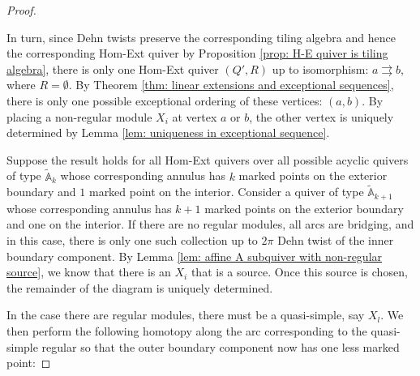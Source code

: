 \documentclass[12pt]{amsart}
\theoremstyle{plain}
\theoremstyle{definition}
\theoremstyle{remark}
\begin{document}
\begin{proof}
\begin{center}
\end{center}

In turn, since Dehn twists preserve the corresponding tiling algebra and hence the corresponding Hom-Ext quiver by Proposition \ref{prop: H-E quiver is tiling algebra}, there is only one Hom-Ext quiver {\color{black}$(Q',R)$} up to {\color{black} isomorphism}: $a \rightrightarrows b$, where $R = \emptyset$. By Theorem \ref{thm: linear extensions and exceptional sequences}, there is only one possible exceptional ordering of these vertices: $(a,b)$. By placing a non-regular module $X_i$ at vertex $a$ or $b$, the other vertex is uniquely determined by Lemma \ref{lem: uniqueness in exceptional sequence}.

{\color{black} Suppose the result holds for all Hom-Ext quivers over all possible acyclic quivers of type $\tilde{\mathbb{A}}_{k}$ whose corresponding annulus has $k$ marked points on the exterior boundary and $1$ marked point on the interior. Consider a quiver of type $\tilde{\mathbb{A}}_{k+1}$ whose corresponding annulus has $k+1$ marked points on the exterior boundary and one on the interior. If there are no regular modules, all arcs are bridging, and in this case, there is only one such collection up to $2\pi$ Dehn twist of the inner boundary component. By Lemma \ref{lem: affine A subquiver with non-regular source}, we know that there is an $X_i$ that is a source. Once this source is chosen, the remainder of the diagram is uniquely determined. 

In the case there are regular modules, there must be a quasi-simple, say $X_l$. We then perform the following homotopy along the arc corresponding to the quasi-simple regular so that the outer boundary component now has one less marked point:}



\end{proof}
\end{document}

